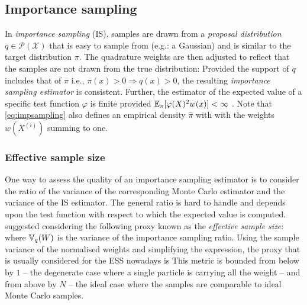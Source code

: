 \subsection{Importance sampling}
In \emph{importance sampling} (IS), samples are drawn from a \emph{proposal distribution} $q\in\mathcal P(\mathcal X)$ that is easy to sample from (e.g.: a Gaussian) and is similar to the target distribution $\pi$. 
The quadrature weights are then adjusted to reflect that the samples are not drawn from the true distribution:
%
%
Provided the support of $q$ includes that of $\pi$ i.e., $\pi(x)>0\Rightarrow q(x)>0$, the resulting \emph{importance sampling estimator} is consistent. Further, the estimator of the expected value of a specific test function $\varphi$ is finite provided $\mathbb E_{\pi}[\varphi(X)^{2}w(x)]<\infty$ \citep[chapter 3.3]{robert04}. Note that \eqref{eq:impsampling} also defines an empirical density $\hat\pi$ with
%
%
with the weights $w(X^{(i)})$ summing to one. 

\subsubsection{Effective sample size}
One way to assess the quality of an importance sampling estimator is to consider the ratio of the variance of the corresponding Monte Carlo estimator and the variance of the IS estimator. The general ratio is hard to handle and depends upon the test function with respect to which the expected value is computed. \citet{kong92} suggested considering the following proxy known as the \emph{effective sample size}:
%
%
where $\mathbb V_{q}(W)$ is the variance of the importance sampling ratio. Using the sample variance of the normalised weights and simplifying the expression, the proxy that is usually considered for the ESS nowadays is
%
%
This metric is bounded from below by $1$ -- the degenerate case where a single particle is carrying all the weight -- and from above by $N$ -- the ideal case where the samples are comparable to ideal Monte Carlo samples. 

